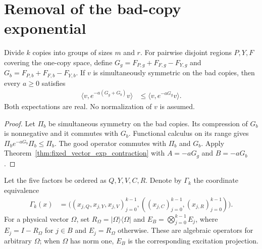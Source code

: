 \section{Removal of the bad-copy exponential}
\label{sec:replica_bad_copy_exponential}

\begin{theorem}
\label{thm:grouped_signed_exponential_comparison}
\leanok
{}
Divide $k$ copies into groups of sizes $m$ and $r$. For pairwise
disjoint regions $P,Y,F$ covering the one-copy space, define
$G_g=F_{P,g}+F_{F,g}-F_{Y,g}$ and
$G_b=F_{P,b}+F_{F,b}-F_{Y,b}$. If $v$ is simultaneously symmetric
on the bad copies, then every $a\ge0$ satisfies
\begin{align}
 \langle v,e^{-a(G_g+G_b)}v\rangle
 &\le\langle v,e^{-aG_g}v\rangle.
 \label{eq:grouped_signed_exponential}
\end{align}
Both expectations are real. No normalization of $v$ is assumed.
\end{theorem}
\begin{proof}\leanok
Let $\Pi_b$ be simultaneous symmetry on the bad copies. Its
compression of $G_b$ is nonnegative and it commutes with $G_b$.
Functional calculus on its range gives
$\Pi_b e^{-aG_b}\Pi_b\le\Pi_b$.
The good operator commutes with $\Pi_b$ and $G_b$. Apply
Theorem~\ref{thm:fixed_vector_exp_contraction} with
$A=-aG_g$ and $B=-aG_b$.
\end{proof}

Let the five factors be ordered as $Q,Y,V,C,R$. Denote by $\Gamma_k$
the coordinate equivalence
\begin{align}
 \Gamma_k(x)
 &=\bigl((x_{j,Q},x_{j,Y},x_{j,V})_{j=0}^{k-1},
          ((x_{j,C})_{j=0}^{k-1},(x_{j,R})_{j=0}^{k-1})\bigr).
\end{align}
For a physical vector $\Omega$, set
$R_\Omega=|\Omega\rangle\langle\Omega|$ and
$E_B=\bigotimes_{j=0}^{k-1} E_j$, where $E_j=I-R_\Omega$ for
$j\in B$ and $E_j=R_\Omega$ otherwise. These are algebraic
operators for arbitrary $\Omega$; when $\Omega$ has norm one,
$E_B$ is the corresponding excitation projection.


